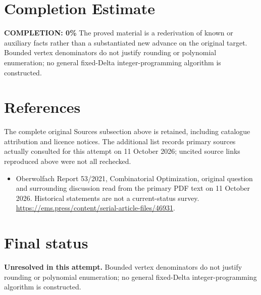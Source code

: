 \documentclass[11pt]{article}
\begin{document}
\section{Completion Estimate}
\noindent\textbf{COMPLETION: 0\%}
The proved material is a rederivation of known or auxiliary facts rather than a substantiated new advance on the original target. Bounded vertex denominators do not justify rounding or polynomial enumeration; no general fixed-Delta integer-programming algorithm is constructed.
\section{References}
The complete original Sources subsection above is retained, including catalogue attribution and licence notices. The additional list records primary sources actually consulted for this attempt on 11 October 2026; uncited source links reproduced above were not all rechecked.
\begin{itemize}
\item Oberwolfach Report 53/2021, Combinatorial Optimization, original question and surrounding discussion read from the primary PDF text on 11 October 2026. Historical statements are not a current-status survey. \url{https://ems.press/content/serial-article-files/46931}.
\end{itemize}
\section{Final status}
\textbf{Unresolved in this attempt.} Bounded vertex denominators do not justify rounding or polynomial enumeration; no general fixed-Delta integer-programming algorithm is constructed.
\end{document}
